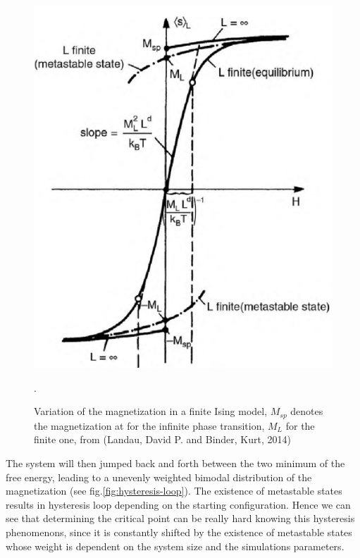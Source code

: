 \documentclass[ansiapaper]{report}
\begin{document}
\begin{multicols}{3}
\begin{figure}[H]
    \begin{center}
        \includegraphics[width=1\linewidth]{figures/first_order_finite.png}
    \end{center}
    \caption{Variation of the magnetization in a finite Ising model, $M_{sp}$ denotes the magnetization at for the infinite phase transition, $M_L$ for the finite one, from (Landau, David P. and Binder, Kurt, 2014) \cite{Landau}}.
        \label{fig:1st-finite}
\end{figure}

The system will then jumped back and forth between the two minimum of the free energy, leading to a unevenly weighted bimodal distribution of the magnetization (see fig.\ref{fig:hysteresis-loop}). The existence of metastable states results in hysteresis loop depending on the starting configuration. Hence we can see that determining the critical point can be really hard knowing this hysteresis phenomenons, since it is constantly shifted by the existence of metastable states whose weight is dependent on the system size and the simulations parameters.


\end{multicols}
\end{document}
